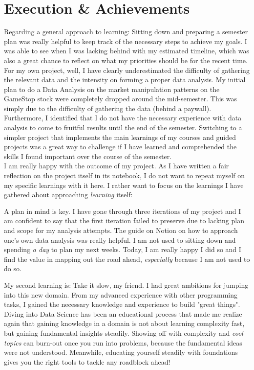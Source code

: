 \documentclass[a4paper]{article}
\begin{document}
\section{Execution \& Achievements}
Regarding a general approach to learning: 
Sitting down and preparing a semester plan was really helpful to keep track of the necessary steps to achieve my goals. 
I was able to see when I was lacking behind with my estimated timeline, which was also a great chance to reflect on what my priorities should be for the recent time.
\\\newline
For my own project, well, I have clearly underestimated the difficulty of gathering the relevant data and the intensity on forming a proper data analysis. My initial plan to do a Data Analysis on the market manipulation patterns on the GameStop stock were completely dropped around the mid-semester. This was simply due to the difficulty of gathering the data (behind a paywall). Furthermore, I identified that I do not have the necessary experience with data analysis to come to fruitful results until the end of the semester. Switching to a simpler project that implements the main learnings of my courses and guided projects was a great way to challenge if I have learned and comprehended the skills I found important over the course of the semester.
\\\newline
I am really happy with the outcome of my project. As I have written a fair reflection on the project itself in its notebook, I do not want to repeat myself on my specific learnings with it here. I rather want to focus on the learnings I have gathered about approaching \textit{learning} itself: 

A plan in mind is key.  I have gone through three iterations of my project and I am confident to say that the first iteration failed to preserve due to lacking plan and scope for my analysis attempts. 
The guide on Notion on how to approach one's own data analysis was really helpful. I am not used to sitting down and spending \textit{a day} to plan my next weeks. Today, I am really happy I did so and I find the value in mapping out the road ahead, \textit{especially} because I am not used to do so.

My second learning is: Take it slow, my friend. I had great ambitions for jumping into this new domain. From my advanced experience with other programming tasks, I gained the necessary knowledge and experience to build "great things". Diving into Data Science has been an educational process that made me realize again that gaining knowledge in a domain is not about learning complexity fast, but gaining fundamental insights steadily. Showing off with complexity and \textit{cool topics} can burn-out once you run into problems, because the fundamental ideas were not understood. Meanwhile, educating yourself steadily with foundations gives you the right tools to tackle any roadblock ahead!
\end{document}
